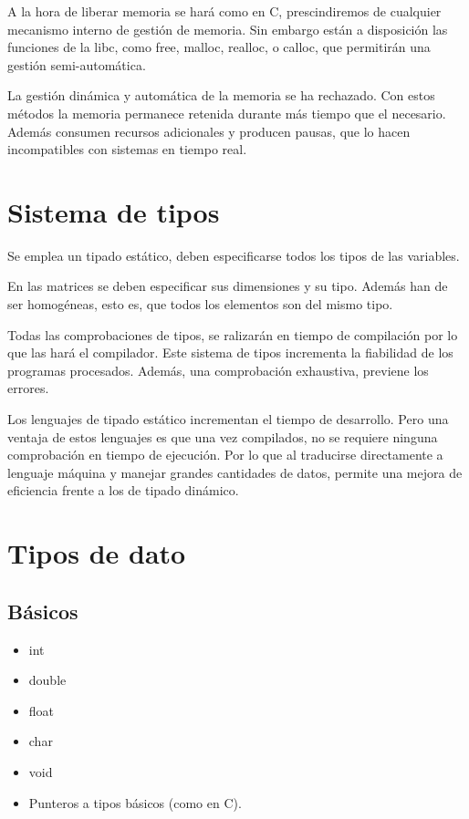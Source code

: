 \documentclass[12pt,a4paper]{article}
\begin{document}
A la hora de liberar memoria se hará como en C, prescindiremos de cualquier 
mecanismo interno de gestión de memoria. Sin embargo están a disposición las 
funciones de la libc, como free, malloc, realloc, o calloc, que permitirán una 
gestión semi-automática.

La gestión dinámica y automática de la memoria se ha rechazado. Con estos 
métodos la memoria permanece retenida durante más tiempo que el necesario.  
Además consumen recursos adicionales y producen pausas, que lo hacen 
incompatibles con sistemas en tiempo real.



\section{Sistema de tipos}
Se emplea un tipado estático, deben especificarse todos los tipos de las 
variables.

En las matrices se deben especificar sus dimensiones y su tipo. Además han de 
ser homogéneas, esto es, que todos los elementos son del mismo tipo.

Todas las comprobaciones de tipos, se ralizarán en tiempo de compilación por lo 
que las hará el compilador. Este sistema de tipos incrementa la fiabilidad de 
los programas procesados. Además, una comprobación exhaustiva, previene los 
errores.

Los lenguajes de tipado estático incrementan el tiempo de desarrollo. Pero una 
ventaja de estos lenguajes es que una vez compilados, no se requiere ninguna 
comprobación en tiempo de ejecución. Por lo que al traducirse directamente a 
lenguaje máquina y manejar grandes cantidades de datos, permite una mejora de 
eficiencia frente a los de tipado dinámico.



\section{Tipos de dato}

\subsection
{Básicos}

\begin{itemize}
\item int
\item double
\item float
\item char
\item void
\item Punteros a tipos básicos (como en C).
\end{itemize}
\end{document}
